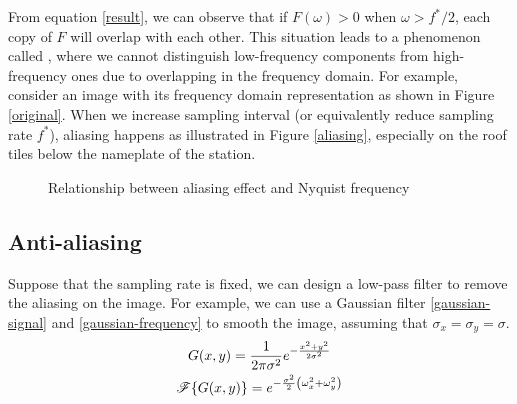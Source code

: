 From equation \eqref{result}, we can observe that if $F(\omega) > 0$ when $\omega > f^* / 2$, each copy of $F$ will overlap with each other. This situation leads to a phenomenon called , where we cannot distinguish low-frequency components from high-frequency ones due to overlapping in the frequency domain. For example, consider an image with its frequency domain representation as shown in Figure \ref{original}. When we increase sampling interval (or equivalently reduce sampling rate $f^*$), aliasing happens as illustrated in Figure \ref{aliasing}, especially on the roof tiles below the nameplate of the station.

\begin{figure}[h]
    \centering
    \hspace*{\fill}
    \hspace*{\fill}
    \hspace*{\fill}
    \caption{Relationship between aliasing effect and Nyquist frequency}
\end{figure}

\subsection{Anti-aliasing}
Suppose that the sampling rate is fixed, we can design a low-pass filter to remove the aliasing on the image. For example, we can use a Gaussian filter \eqref{gaussian-signal} and \eqref{gaussian-frequency} to smooth the image, assuming that $\sigma_x = \sigma_y = \sigma$.
\begin{subequations}
    \begin{gather}
        G(x,y) = \frac{1}{2\pi\sigma^2}e^{-\frac{x^2 + y^2}{2\sigma^2}} \label{gaussian-signal} \\
        \fourier{G(x,y)} = e^{-\frac{\sigma^2}{2}\parens*{\omega_x^2 + \omega_y^2}} \label{gaussian-frequency}
    \end{gather}
\end{subequations}

